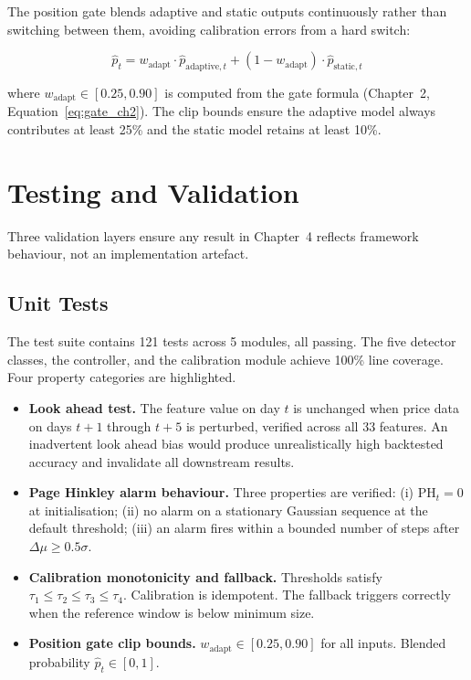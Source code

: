The position gate blends adaptive and static outputs continuously rather than switching between them, avoiding calibration errors from a hard switch:

\begin{equation}
  \hat{p}_t = w_{\text{adapt}} \cdot \hat{p}_{\text{adaptive},t}
            + (1 - w_{\text{adapt}}) \cdot \hat{p}_{\text{static},t}
  \label{eq:blend}
\end{equation}

where $w_{\text{adapt}} \in [0.25, 0.90]$ is computed from the gate formula (Chapter~2, Equation~\ref{eq:gate_ch2}). The clip bounds ensure the adaptive model always contributes at least 25\% and the static model retains at least 10\%.

\section{Testing and Validation}
\label{sec:testing}

Three validation layers ensure any result in Chapter~4 reflects framework behaviour, not an implementation artefact. 


\subsection{Unit Tests}
\label{subsec:unit_tests}

The test suite contains 121 tests across 5 modules, all passing. The five detector classes, the controller, and the calibration module achieve 100\% line coverage. Four property categories are highlighted.

\begin{itemize}
  \item \textbf{Look ahead test.} The feature value on day $t$ is unchanged when
    price data on days $t{+}1$ through $t{+}5$ is perturbed, verified across all 33
    features. An inadvertent look ahead bias would produce unrealistically high
    backtested accuracy and invalidate all downstream results.

  \item \textbf{Page Hinkley alarm behaviour.} Three properties are verified: (i)
    $\text{PH}_t = 0$ at initialisation; (ii) no alarm on a stationary Gaussian
    sequence at the default threshold; (iii) an alarm fires within a bounded number
    of steps after $\Delta\mu \geq 0.5\sigma$.

  \item \textbf{Calibration monotonicity and fallback.} Thresholds satisfy
    $\tau_1 \leq \tau_2 \leq \tau_3 \leq \tau_4$. Calibration is idempotent. The
    fallback triggers correctly when the reference window is below minimum size.

  \item \textbf{Position gate clip bounds.} $w_{\text{adapt}} \in [0.25, 0.90]$
    for all inputs. Blended probability $\hat{p}_t \in [0,1]$.
\end{itemize}

